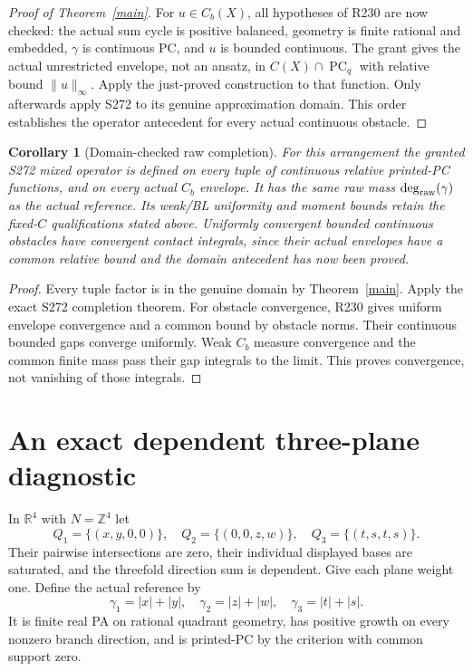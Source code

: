 \documentclass[11pt]{article}
\newtheorem{corollary}[theorem]{Corollary}
\newcommand{\R}{\mathbb R}
\newcommand{\Z}{\mathbb Z}
\newcommand{\PC}{\operatorname{PC}_{q}}
\begin{document}
\begin{proof}[Proof of Theorem~\ref{main}]
For $u\in C_b(X)$, all hypotheses of R230 are now checked: the actual sum cycle is positive balanced, geometry is finite rational and embedded, $\gamma$ is continuous PC, and $u$ is bounded continuous. The grant gives the actual unrestricted envelope, not an ansatz, in $C(X)\cap\PC$ with relative bound $\|u\|_\infty$. Apply the just-proved construction to that function. Only afterwards apply S272 to its genuine approximation domain. This order establishes the operator antecedent for every actual continuous obstacle.
\end{proof}

\begin{corollary}[Domain-checked raw completion]
For this arrangement the granted S272 mixed operator is defined on every tuple of continuous relative printed-PC functions, and on every actual $C_b$ envelope. It has the same raw mass $\deg_{\rm raw}(\gamma)$ as the actual reference. Its weak/BL uniformity and moment bounds retain the fixed-$C$ qualifications stated above. Uniformly convergent bounded continuous obstacles have convergent contact integrals, since their actual envelopes have a common relative bound and the domain antecedent has now been proved.
\end{corollary}
\begin{proof}
Every tuple factor is in the genuine domain by Theorem~\ref{main}. Apply the exact S272 completion theorem. For obstacle convergence, R230 gives uniform envelope convergence and a common bound by obstacle norms. Their continuous bounded gaps converge uniformly. Weak $C_b$ measure convergence and the common finite mass pass their gap integrals to the limit. This proves convergence, not vanishing of those integrals.
\end{proof}

\section{An exact dependent three-plane diagnostic}
In $\R^4$ with $N=\Z^4$ let
\[
 Q_1=\{(x,y,0,0)\},\quad Q_2=\{(0,0,z,w)\},\quad
 Q_3=\{(t,s,t,s)\}.
\]
Their pairwise intersections are zero, their individual displayed bases are saturated, and the threefold direction sum is dependent. Give each plane weight one. Define the actual reference by
\[
 \gamma_1=|x|+|y|,\quad \gamma_2=|z|+|w|,\quad
 \gamma_3=|t|+|s|.
\]
It is finite real PA on rational quadrant geometry, has positive growth on every nonzero branch direction, and is printed-PC by the criterion with common support zero.
\end{document}
